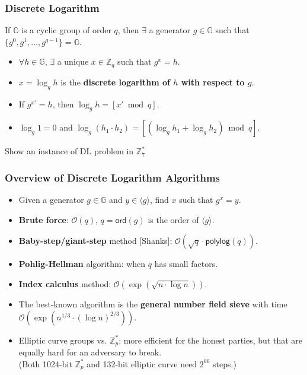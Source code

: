 \begin{frame}\frametitle{Discrete Logarithm}
If $\mathbb{G}$ is a cyclic group of order $q$, then $\exists$ a generator $g \in \mathbb{G}$ such that $\{ g^0,g^1,\dotsc,g^{q-1}\} = \mathbb{G}$.
\begin{itemize}
\item $\forall h \in \mathbb{G}$, $\exists$ a unique $x \in \mathbb{Z}_q$ such that $g^x = h$.
\item $x= \log_gh$ is the \textbf{\textbf{discrete logarithm} of $h$ with respect to $g$}.
\item If $g^{x'}=h$, then $\log_gh = [x' \bmod q]$.
\item $\log_g1=0$ and $\log_g(h_1\cdot h_2) = [(\log_gh_1+\log_gh_2) \bmod q]$.
\end{itemize}
\begin{exampleblock}{}
Show an instance of DL problem in $\mathbb{Z}_{7}^{*}$
\end{exampleblock}
\end{frame}
\begin{frame}\frametitle{Overview of Discrete Logarithm Algorithms}
\begin{itemize}
\item Given a generator $g \in \mathbb{G}$ and $y \in \langle g \rangle$, find $x$ such that $g^x=y$.
\item \textbf{Brute force}: $\mathcal{O}(q)$, $q = \mathsf{ord}(g)$ is the order of $\langle g\rangle$.
\item \textbf{Baby-step/giant-step} method [Shanks]: $\mathcal{O}(\sqrt{q}\cdot \mathsf{polylog}(q))$.
\item \textbf{Pohlig-Hellman} algorithm: when $q$ has small factors.
\item \textbf{Index calculus} method: $\mathcal{O}(\exp{(\sqrt{n\cdot \log n})})$.
\item The best-known algorithm is the \textbf{general number field sieve} with time $\mathcal{O}(\exp(n^{1/3}\cdot(\log n)^{2/3}))$.
\item Elliptic curve groups vs. $\mathbb{Z}_p^*$: more efficient for the honest parties, but that are equally hard for an adversary to break.\\ (Both 1024-bit $\mathbb{Z}_p^*$ and 132-bit elliptic curve need $2^{66}$ steps.)
\end{itemize}
\end{frame}
